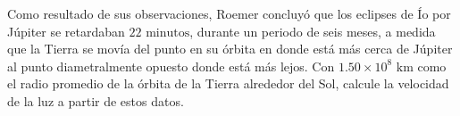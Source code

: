 \item Como resultado de sus observaciones, Roemer concluyó que los eclipses de Ío por Júpiter se retardaban $22\text{ minutos}$, durante un periodo de seis meses, a medida que la Tierra se movía del punto en su órbita en donde está más cerca de Júpiter al punto diametralmente opuesto donde está más lejos. Con $1.50 \times 10^8\text{ km}$ como el radio promedio de la órbita de la Tierra alrededor del Sol, calcule la velocidad de la luz a partir de estos datos.